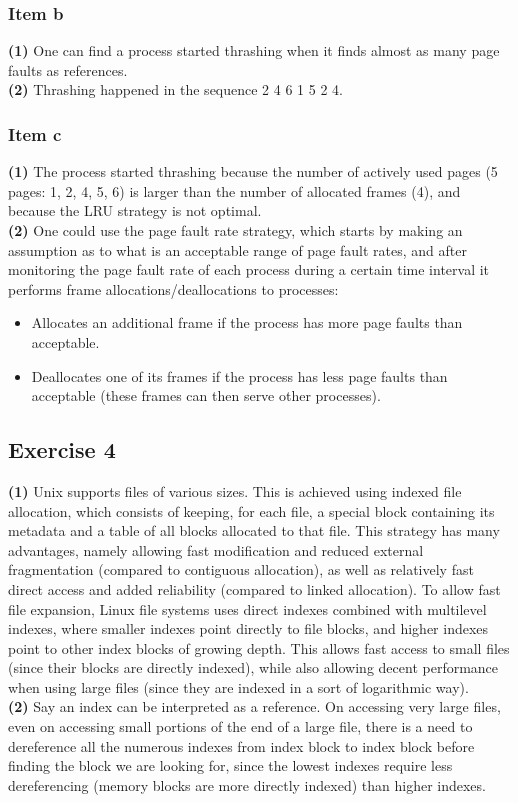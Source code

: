 {\subsubsection{Item b}
\textbf{(1)} One can find a process started thrashing when it finds almost as many page faults as references.\\
\textbf{(2)} Thrashing happened in the sequence 2 4 6 1 5 2 4.

\subsubsection{Item c}
\textbf{(1)} The process started thrashing because the number of actively used pages (5 pages: 1, 2, 4, 5, 6) is larger than the number of allocated frames (4), and because the LRU strategy is not optimal.\\
\textbf{(2)} One could use the page fault rate strategy, which starts by making an assumption as to what is an acceptable range of page fault rates, and after monitoring the page fault rate of each process during a certain time interval it performs frame allocations/deallocations to processes:
\begin{itemize}
    \item Allocates an additional frame if the process has more page faults than acceptable.
    \item Deallocates one of its frames if the process has less page faults than acceptable (these frames can then serve other processes).
\end{itemize}

\subsection{Exercise 4}

\textbf{(1)} Unix supports files of various sizes. This is achieved using indexed file allocation, which consists of keeping, for each file, a special block containing its metadata and a table of all blocks allocated to that file. This strategy has many advantages, namely allowing fast modification and reduced external fragmentation (compared to contiguous allocation), as well as relatively fast direct access and added reliability (compared to linked allocation). To allow fast file expansion, Linux file systems uses direct indexes combined with multilevel indexes, where smaller indexes point directly to file blocks, and higher indexes point to other index blocks of growing depth. This allows fast access to small files (since their blocks are directly indexed), while also allowing decent performance when using large files (since they are indexed in a sort of logarithmic way).\\
\textbf{(2)} Say an index can be interpreted as a reference. On accessing very large files, even on accessing small portions of the end of a large file, there is a need to dereference all the numerous indexes from index block to index block before finding the block we are looking for, since the lowest indexes require less dereferencing (memory blocks are more directly indexed) than higher indexes.

}
